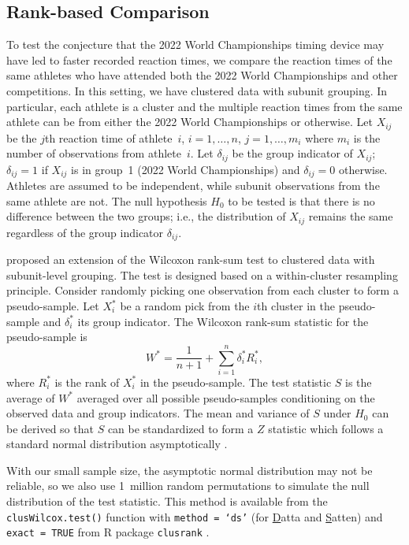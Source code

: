 \documentclass[12pt, letterpaper, titlepage]{article}
\begin{document}
\subsection{Rank-based Comparison}\label{sec:rank}


To test the conjecture that the 2022 World Championships timing device may have 
led to faster recorded reaction times, we compare the reaction times of the same
athletes who have attended both the 2022 World Championships and other 
competitions. 
In this setting, we have clustered data with subunit grouping. In particular,
each athlete is a cluster and the multiple reaction times from the same athlete
can be from either the 2022 World Championships or otherwise.
Let $X_{ij}$ be the $j$th reaction time of athlete~$i$, $i = 1, \ldots, n$,
$j = 1, \ldots, m_i$ where $m_i$ is the number of observations from
athlete~$i$. Let $\delta_{ij}$ be the group indicator of $X_{ij}$; $\delta_{ij}
= 1$ if $X_{ij}$ is in group~1 (2022 World Championships) and $\delta_{ij} = 0$ 
otherwise. Athletes are
assumed to be independent, while subunit observations from the same athlete are
not. The null hypothesis $H_0$ to be tested is that there is no difference
between the two groups; i.e., the distribution of $X_{ij}$ remains the same
regardless of the group indicator $\delta_{ij}$.


\citet{datta2005rank} proposed an extension of the Wilcoxon rank-sum test to
clustered data with subunit-level grouping. The test is designed based on a
within-cluster resampling principle. Consider randomly picking one observation
from each cluster to form a pseudo-sample. Let $X_i^*$ be a random pick from the
$i$th cluster in the pseudo-sample and $\delta_i^*$ its group indicator. The
Wilcoxon rank-sum statistic for the pseudo-sample is
\[
W^* = \frac{1}{n + 1} + \sum_{i=1}^{n} \delta_{i}^{*} R_{i}^{*},
\]
where $R_{i}^{*}$ is the rank of $X_{i}^{*}$ in the pseudo-sample.
The test statistic $S$ is the average of $W^*$ averaged over all possible
pseudo-samples conditioning on the observed data and group indicators.
The mean and variance of $S$ under $H_0$ can be derived so that $S$ can be
standardized to form a $Z$ statistic which follows a standard normal distribution
asymptotically \citep[p.910]{datta2005rank}.


With our small sample size, the asymptotic normal distribution may not be
reliable, so we also use 1~million random permutations to simulate the null 
distribution of the test statistic.
This method is available from the \texttt{clusWilcox.test()} function
with \texttt{method = `ds'} (for \underline{D}atta and \underline{S}atten) and 
\texttt{exact = TRUE} from R package
\texttt{clusrank} \citep{jiang2020wilcoxon}. 
\end{document}
